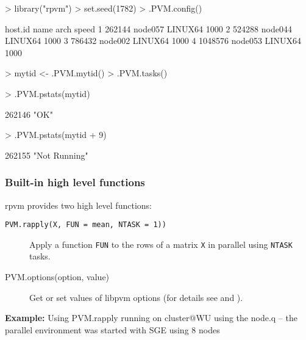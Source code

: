 \begin{Schunk}
\begin{Sinput}
> library("rpvm")
> set.seed(1782)
> .PVM.config()
\end{Sinput}
\begin{Soutput}
  host.id    name    arch speed
1  262144 node057 LINUX64  1000
2  524288 node044 LINUX64  1000
3  786432 node002 LINUX64  1000
4 1048576 node053 LINUX64  1000
\end{Soutput}
\begin{Sinput}
> mytid <- .PVM.mytid()
> .PVM.tasks()
\end{Sinput}
\begin{Sinput}
> .PVM.pstats(mytid)
\end{Sinput}
\begin{Soutput}
262146 
  "OK" 
\end{Soutput}
\begin{Sinput}
> .PVM.pstats(mytid + 9)
\end{Sinput}
\begin{Soutput}
       262155 
"Not Running" 
\end{Soutput}
\end{Schunk}


\subsubsection{Built-in high level functions}

rpvm provides two high level functions: 

\begin{description}
\item[\texttt{PVM.rapply(X, FUN = mean, NTASK = 1))}] Apply a function
  \texttt{FUN} to the rows of a matrix \texttt{X} in
  parallel using \texttt{NTASK} tasks.
\item[PVM.options(option, value)] Get or set values of libpvm options
  (for details see \cite{nali07rpvm} and \cite{geist94pvm}).
\end{description}


\textbf{Example:} Using PVM.rapply\newline
running on cluster@WU using the node.q -- the parallel environment was
started with SGE using 8 nodes

